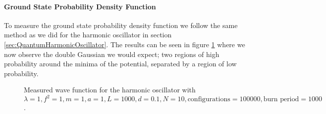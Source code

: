 \documentclass[12pt]{article}
\begin{document}
            \paragraph{Ground State Probability Density Function}
                To measure the ground state probability density function we follow the same method as we did for the harmonic oscillator in section \ref{sec:QuantumHarmonicOscillator}. The results can be seen in figure \ref{fig:AnharmonicWaveFunction} where we now observe the double Gaussian we would expect; two regions of high probability around the minima of the potential, separated by a region of low probability.
                \begin{figure}
                    \centering
                    \caption{Measured wave function for the harmonic oscillator with $\lambda = 1, f^2=1,  m = 1, a = 1, L = 1000, d = 0.1, N = 10, \text{configurations} = 100000, \text{burn period} = 1000$.}
                    \label{fig:AnharmonicWaveFunction}
                \end{figure}
\end{document}

